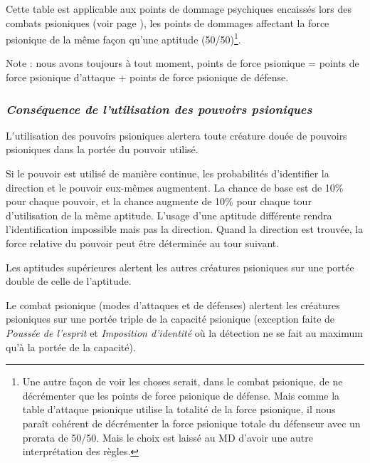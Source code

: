 \bigskip

Cette table est applicable aux points de dommage psychiques encaissés lors des combats psioniques (voir page \pageref{custom-combat}), les points de dommages affectant la force psionique de la même façon qu'une aptitude (50/50)\footnote{Une autre façon de voir les choses serait, dans le combat psionique, de ne décrémenter que les points de force psionique de défense. Mais comme la table d'attaque psionique utilise la totalité de la force psionique, il nous paraît cohérent de décrémenter la force psionique totale du défenseur avec un prorata de 50/50. Mais le choix est laissé au MD d'avoir une autre interprétation des règles.}.

\bigskip

Note : nous avons toujours à tout moment, points de force psionique = points de force psionique d'attaque + points de force psionique de défense.

\subsubsection*{\textit{Conséquence de l'utilisation des pouvoirs psioniques}}
\label{custom-alerte-pouvoirs}

L'utilisation des pouvoirs psioniques alertera toute créature douée de pouvoirs psioniques dans la portée du pouvoir utilisé.

\bigskip

Si le pouvoir est utilisé de manière continue, les probabilités d'identifier la direction et le pouvoir eux-mêmes augmentent. La chance de base est de 10\% pour chaque pouvoir, et la chance augmente de 10\% pour chaque tour d'utilisation de la même aptitude. L'usage d'une aptitude différente rendra l'identification impossible mais pas la direction. Quand la direction est trouvée, la force relative du pouvoir peut être déterminée au tour suivant.

\bigskip

Les aptitudes supérieures alertent les autres créatures psioniques sur une portée double de celle de l'aptitude.

\bigskip

Le combat psionique (modes d'attaques et de défenses) alertent les créatures psioniques sur une portée triple de la capacité psionique (exception faite de \textit{Poussée de l'esprit} et \textit{Imposition d'identité} où la détection ne se fait au maximum qu'à la portée de la capacité).

